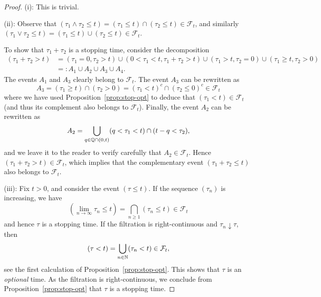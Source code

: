 \begin{proof}
(i): This is trivial.

(ii): Observe that $(\tau_1 \wedge \tau_2 \le t) = (\tau_1 \le t) \cap (\tau_2 \le t) \in\mathcal{F}_t$, and similarly $(\tau_1 \vee \tau_2 \le t) = (\tau_1 \le t) \cup (\tau_2 \le t) \in\mathcal{F}_t$.

To show that $\tau_1+\tau_2$ is a stopping time, consider the decomposition
\begin{align*}
    (\tau_1+\tau_2>t) &= (\tau_1=0, \tau_2>t)\cup (0<\tau_1<t, \tau_1+\tau_2>t)\cup (\tau_1>t, \tau_2=0)\cup (\tau_1\ge t, \tau_2>0) \\
    &=: A_1\cup A_2\cup A_3\cup A_4.
\end{align*}
The events $A_1$ and $A_3$ clearly belong to $\mathcal{F}_t$. The event $A_3$ can be rewritten as
\begin{equation*}
    A_3 = (\tau_1\ge t)\cap (\tau_2>0) = (\tau_1 < t)^c \cap (\tau_2\le 0)^c \in\mathcal{F}_t
\end{equation*}
where we have used Proposition~\ref{prop:stop-opt} to deduce that $(\tau_1<t)\in\mathcal{F}_t$ (and thus its complement also belongs to $\mathcal{F}_t$). Finally, the event $A_2$ can be rewritten as
\begin{equation*}
    A_2 = \bigcup_{q\in\mathbb{Q}\cap (0,t)}(q<\tau_1<t)\cap (t-q<\tau_2),
\end{equation*}
and we leave it to the reader to verify carefully that $A_2\in\mathcal{F}_t$. Hence $(\tau_1+\tau_2>t)\in\mathcal{F}_t$, which implies that the complementary event $(\tau_1+\tau_2\le t)$ also belongs to $\mathcal{F}_t$.

(iii): Fix $t > 0$, and consider the event $(\tau\le t)$. If the sequence $(\tau_n)$ is increasing, we have
\begin{equation*}
    (\lim_{n \to \infty} \tau_n \le t) = \bigcap_{n \ge 1} (\tau_n \le t) \in \mathcal{F}_t
\end{equation*}
and hence $\tau$ is a stopping time. If the filtration is right-continuous and $\tau_n\downarrow\tau$, then
\begin{equation*}
    (\tau<t) = \bigcup_{n\in\mathbb{N}}(\tau_n<t)\in\mathcal{F}_t,
\end{equation*}
see the first calculation of Proposition~\ref{prop:stop-opt}. This shows that $\tau$ is an \emph{optional} time. As the filtration is right-continuous, we conclude from Proposition~\ref{prop:stop-opt} that $\tau$ is a stopping time.
\end{proof}


